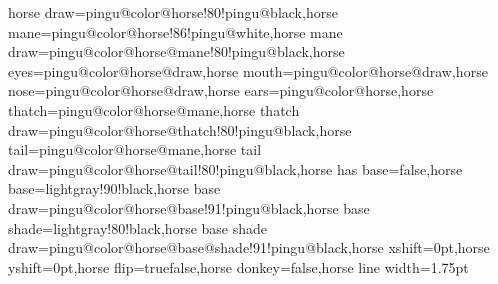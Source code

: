{}{horse \@lr\space draw=\csname pingu@color@horse\@lr\endcsname!80!pingu@black,horse \@lr\space mane=\csname pingu@color@horse\@lr\endcsname!86!pingu@white,horse \@lr\space mane draw=\csname pingu@color@horse\@lr @mane\endcsname!80!pingu@black,horse \@lr\space eyes=\csname pingu@color@horse\@lr @draw\endcsname,horse \@lr\space mouth=\csname pingu@color@horse\@lr @draw\endcsname,horse \@lr\space nose=\csname pingu@color@horse\@lr @draw\endcsname,horse \@lr\space ears=\csname pingu@color@horse\@lr\endcsname,horse \@lr\space thatch=\csname pingu@color@horse\@lr @mane\endcsname,horse \@lr\space thatch draw=\csname pingu@color@horse\@lr @thatch\endcsname!80!pingu@black,horse \@lr\space tail=\csname pingu@color@horse\@lr @mane\endcsname,horse \@lr\space tail draw=\csname pingu@color@horse\@lr @tail\endcsname!80!pingu@black,horse \@lr\space has base=false,horse \@lr\space base=lightgray!90!black,horse \@lr\space base draw=\csname pingu@color@horse\@lr @base\endcsname!91!pingu@black,horse \@lr\space base shade=lightgray!80!black,horse \@lr\space base shade draw=\csname pingu@color@horse\@lr @base@shade\endcsname!91!pingu@black,horse \@lr\space xshift=0pt,horse \@lr\space yshift=0pt,horse \@lr\space flip=\ifx\@lr\pingu@str@wing@left true\else false\fi,horse \@lr\space donkey=false,horse \@lr\space line width=1.75pt}

\def\pingu@draw@wi@horse#1{%
    \pingu@setup@wing{horse}{#1}%
\scope[scale=\pingu@@horse@scale,every path/.append style={line cap=round, line join=round},shift=(\pingu@name-wing-#1),rotate around={\@angle-5:(\pingu@name-wing-#1)}]
\csname if@pingu@x@horse@#1@flip@\endcsname
\scope[xshift=-4cm-\csname pingu@x@horse#1@xshift\endcsname,yshift=-42mm+\csname pingu@x@horse#1@yshift\endcsname]
\else
\scope[xshift=4cm+\csname pingu@x@horse#1@xshift\endcsname,yshift=-42mm+\csname pingu@x@horse#1@yshift\endcsname,xscale=-1]
\fi
\csname if@pingu@x@horse@#1@donkey@\endcsname
    \@pingu@@horse@@donkey@true
\fi
    \edef\@pingu@@horse@lw{\csname pingu@horse#1@x@line@width\endcsname}
    \pingu@@drawer@horse{#1}
\endscope\endscope
}

